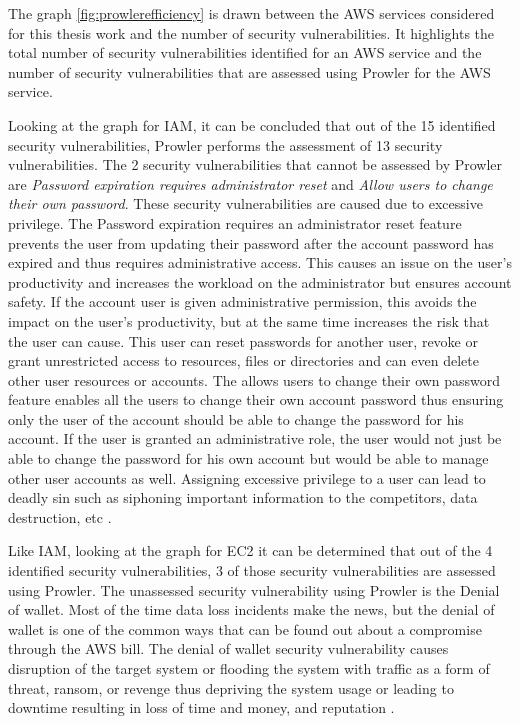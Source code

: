 \par The graph \ref{fig:prowlerefficiency} is drawn between the AWS services considered for this thesis work and the number of security vulnerabilities.
It highlights the total number of security vulnerabilities identified for an AWS service and the number of security vulnerabilities that are assessed using Prowler for the AWS service.

\par Looking at the graph for IAM, it can be concluded that out of the 15 identified security vulnerabilities, Prowler performs the assessment of 13 security vulnerabilities.
The 2 security vulnerabilities that cannot be assessed by Prowler are \textit{Password expiration requires administrator reset} and \textit{Allow users to change their own password}.
These security vulnerabilities are caused due to excessive privilege.
The Password expiration requires an administrator reset feature prevents the user from updating their password after the account password has expired and thus requires administrative access.
This causes an issue on the user’s productivity and increases the workload on the administrator but ensures account safety.
If the account user is given administrative permission, this avoids the impact on the user’s productivity, but at the same time increases the risk that the user can cause.
This user can reset passwords for another user, revoke or grant unrestricted access to resources, files or directories and can even delete other user resources or accounts.
The allows users to change their own password feature enables all the users to change their own account password thus ensuring only the user of the account should be able to change the password for his account.
If the user is granted an administrative role, the user would not just be able to change the password for his own account but would be able to manage other user accounts as well.
Assigning excessive privilege to a user can lead to 
deadly sin such as siphoning important information to the
competitors, data destruction, etc \cite{87}.

\par Like IAM, looking at the graph for EC2 it can be determined that out of the 4 identified security vulnerabilities, 3 of those security vulnerabilities are assessed using Prowler.
 The unassessed security vulnerability using Prowler is the Denial of wallet.
 Most of the time data loss incidents make the news, but the denial of wallet is one of the common ways that can be found out about a compromise through the AWS bill.
 The denial of wallet security vulnerability causes 
disruption of the target system or flooding the system 
with traffic as a form of threat, ransom, or revenge thus
depriving the system usage or leading to downtime 
resulting in loss of time and money, and reputation \cite{86}.

